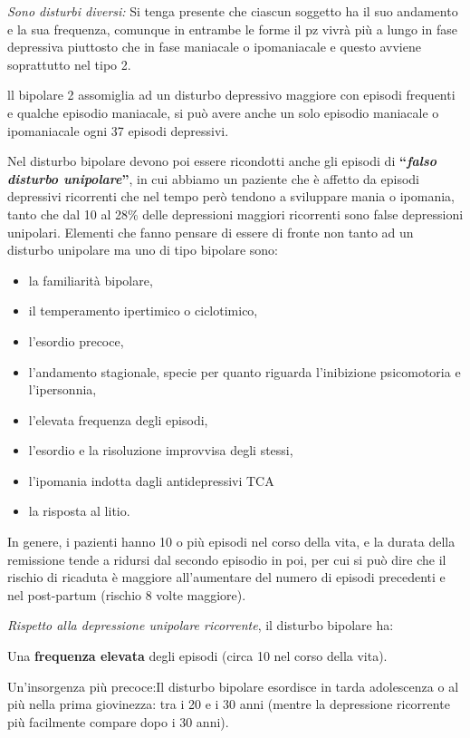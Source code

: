 \documentclass[]{article}
\begin{document}
\emph{Sono disturbi diversi:} Si tenga presente che ciascun soggetto ha
il suo andamento e la sua frequenza, comunque in entrambe le forme il pz
vivrà più a lungo in fase depressiva piuttosto che in fase maniacale o
ipomaniacale e questo avviene soprattutto nel tipo 2.

ll bipolare 2 assomiglia ad un disturbo depressivo maggiore con episodi
frequenti e qualche episodio maniacale, si può avere anche un solo
episodio maniacale o ipomaniacale ogni 37 episodi depressivi.

Nel disturbo bipolare devono poi essere ricondotti anche gli episodi di
\textbf{``\emph{falso disturbo unipolare}''}, in cui abbiamo un paziente
che è affetto da episodi depressivi ricorrenti che nel tempo però
tendono a sviluppare mania o ipomania, tanto che dal 10 al 28\% delle
depressioni maggiori ricorrenti sono false depressioni unipolari.
Elementi che fanno pensare di essere di fronte non tanto ad un disturbo
unipolare ma uno di tipo bipolare sono:

\begin{itemize}
\item
  la familiarità bipolare,
\item
  il temperamento ipertimico o ciclotimico,
\item
  l'esordio precoce,
\item
  l'andamento stagionale, specie per quanto riguarda l'inibizione
  psicomotoria e l'ipersonnia,
\item
  l'elevata frequenza degli episodi,
\item
  l'esordio e la risoluzione improvvisa degli stessi,
\item
  l'ipomania indotta dagli antidepressivi TCA
\item
  la risposta al litio.
\end{itemize}

In genere, i pazienti hanno 10 o più episodi nel corso della vita, e la
durata della remissione tende a ridursi dal secondo episodio in poi, per
cui si può dire che il rischio di ricaduta è maggiore all'aumentare del
numero di episodi precedenti e nel post-partum (rischio 8 volte
maggiore).

\emph{Rispetto alla depressione unipolare ricorrente}, il disturbo
bipolare ha:

Una \textbf{frequenza elevata} degli episodi (circa 10 nel corso della
vita).

Un'insorgenza più precoce:Il disturbo bipolare esordisce in tarda
adolescenza o al più nella prima giovinezza: tra i 20 e i 30 anni
(mentre la depressione ricorrente più facilmente compare dopo i 30
anni).
\end{document}
